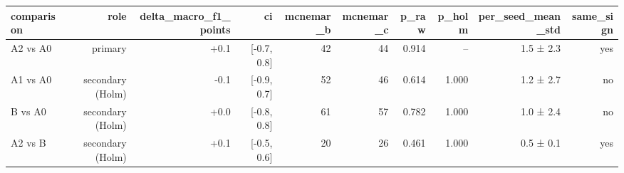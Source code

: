 \begin{tabular}{lrrrrrrrrr}
\toprule
comparison & role & delta\_macro\_f1\_points & ci & mcnemar\_b & mcnemar\_c & p\_raw & p\_holm & per\_seed\_mean\_std & same\_sign \\
\midrule
A2 vs A0 & primary & +0.1 & [-0.7, 0.8] & 42 & 44 & 0.914 & -- & 1.5 ± 2.3 & yes \\
A1 vs A0 & secondary (Holm) & -0.1 & [-0.9, 0.7] & 52 & 46 & 0.614 & 1.000 & 1.2 ± 2.7 & no \\
B vs A0 & secondary (Holm) & +0.0 & [-0.8, 0.8] & 61 & 57 & 0.782 & 1.000 & 1.0 ± 2.4 & no \\
A2 vs B & secondary (Holm) & +0.1 & [-0.5, 0.6] & 20 & 26 & 0.461 & 1.000 & 0.5 ± 0.1 & yes \\
\bottomrule
\end{tabular}
